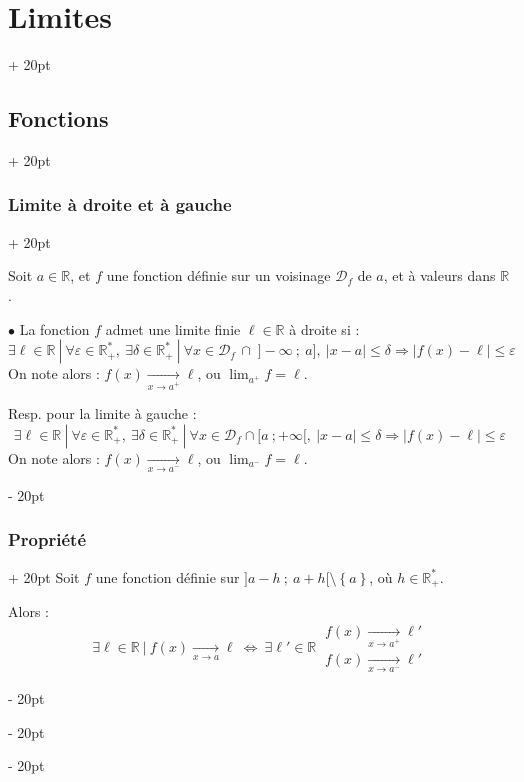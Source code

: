 \documentclass[a4paper, 12pt, twoside]{article}
\newcommand{\R}{\mathbb{R}} %
\newcommand{\tendsto}[1]{\xrightarrow[#1]{}}
\newcommand{\set}[1]{\left\{ #1 \right\}}
\newcommand{\abs}[1]{\left\lvert #1 \right\rvert}
\newcommand{\ssi}{\ \Leftrightarrow \ }
\renewcommand{\le}{\leqslant}
\newcommand{\ep}{\varepsilon}
\newcommand{\ind}[1][20pt]{\advance\leftskip + #1}
\newcommand{\deind}[1][20pt]{\advance\leftskip - #1}
\newenvironment{indt}[2][20pt]{#2 \par \ind[#1]}{\par \deind} %
\begin{document}
\begin{indt}{\section{Limites}}
\begin{indt}{\subsection{Fonctions}}
            \vspace{12pt}
            
            \begin{indt}{\subsubsection{Limite à droite et à gauche}}
                \label{1.2.6}
                
                Soit $a \in \R$, et $f$ une fonction définie sur un voisinage $\mathcal D_f$ de $a$, et à valeurs dans $\R$.

                \vspace{6pt}
                
                $\bullet$ La fonction $f$ admet une limite finie $\ell \in \R$ à droite si :
                \[
                    \exists \ell \in \R\ |\
                    \forall \ep \in \R_+^*,\ \exists \delta \in \R_+^*\ |\
                    \forall x \in \mathcal D_f\, \cap\; ]\!-\infty\ ;\ a],\
                    \abs{x - a} \le \delta \Rightarrow \abs{f(x) - \ell} \le \ep
                \]
                On note alors : $f(x) \tendsto{x \to a^+} \ell$, ou $\displaystyle \lim_{a^+} f = \ell$.

                \vspace{6pt}
                
                Resp. pour la limite à gauche :
                \[
                    \exists \ell \in \R\ |\
                    \forall \ep \in \R_+^*,\ \exists \delta \in \R_+^*\ |\
                    \forall x \in \mathcal D_f \cap [a\ ; +\infty[,\
                    \abs{x - a} \le \delta \Rightarrow \abs{f(x) - \ell} \le \ep
                \]
                On note alors : $f(x) \tendsto{x \to a^-} \ell$, ou $\displaystyle \lim_{a^-} f = \ell$.
            \end{indt}

            \vspace{12pt}
            
            \begin{indt}{\subsubsection{Propriété}}
                Soit $f$ une fonction définie sur $] a - h\ ;\ a + h[ \setminus \set a$, où $h \in \R_+^*$.

                Alors :
                \[
                    \exists \ell \in \R\ |\ f(x) \tendsto{x \to a} \ell
                    \ssi
                    \exists \ell' \in \R\
                    \begin{array}{|l}
                        f(x) \tendsto{x \to a^+} \ell'
                        \\
                        f(x) \tendsto{x \to a^-} \ell'
                    \end{array}
                \]


\end{indt}
\end{indt}
\end{indt}
\end{document}

